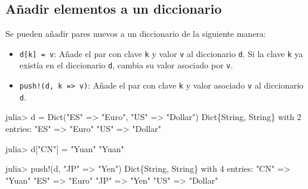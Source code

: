 \documentclass[
  letterpaper,
  DIV=11,
  numbers=noendperiod]{scrreprt}
\newenvironment{Shaded}{\begin{snugshade}}{\end{snugshade}}
\newcommand{\DataTypeTok}[1]{\textcolor[rgb]{0.68,0.00,0.00}{#1}}
\newcommand{\FloatTok}[1]{\textcolor[rgb]{0.68,0.00,0.00}{#1}}
\newcommand{\FunctionTok}[1]{\textcolor[rgb]{0.28,0.35,0.67}{#1}}
\newcommand{\NormalTok}[1]{\textcolor[rgb]{0.00,0.23,0.31}{#1}}
\newcommand{\OperatorTok}[1]{\textcolor[rgb]{0.37,0.37,0.37}{#1}}
\newcommand{\StringTok}[1]{\textcolor[rgb]{0.13,0.47,0.30}{#1}}
\begin{document}
\hypertarget{auxf1adir-elementos-a-un-diccionario}{%
\subsection{Añadir elementos a un
diccionario}\label{auxf1adir-elementos-a-un-diccionario}}

Se pueden añadir pares nuevos a un diccionario de la siguiente manera:

\begin{itemize}
\item
  \texttt{d{[}k{]}\ =\ v}: Añade el par con clave \texttt{k} y valor
  \texttt{v} al diccionario \texttt{d}. Si la clave \texttt{k} ya
  existía en el diccionario \texttt{d}, cambia su valor asociado por
  \texttt{v}.
\item
  \texttt{push!(d,\ k\ =\textgreater{}\ v)}: Añade el par con clave
  \texttt{k} y valor asociado \texttt{v} al diccionario \texttt{d}.
\end{itemize}

\begin{Shaded}
\begin{Highlighting}[]
\NormalTok{julia}\OperatorTok{\textgreater{}}\NormalTok{ d }\OperatorTok{=} \FunctionTok{Dict}\NormalTok{(}\StringTok{"ES"} \OperatorTok{=\textgreater{}} \StringTok{"Euro"}\NormalTok{, }\StringTok{"US"} \OperatorTok{=\textgreater{}} \StringTok{"Dollar"}\NormalTok{)}
\DataTypeTok{Dict}\NormalTok{\{}\DataTypeTok{String}\NormalTok{, }\DataTypeTok{String}\NormalTok{\} with }\FloatTok{2}\NormalTok{ entries}\OperatorTok{:}
  \StringTok{"ES"} \OperatorTok{=\textgreater{}} \StringTok{"Euro"}
  \StringTok{"US"} \OperatorTok{=\textgreater{}} \StringTok{"Dollar"}

\NormalTok{julia}\OperatorTok{\textgreater{}}\NormalTok{ d[}\StringTok{"CN"}\NormalTok{] }\OperatorTok{=} \StringTok{"Yuan"}
\StringTok{"Yuan"}

\NormalTok{julia}\OperatorTok{\textgreater{}} \FunctionTok{push!}\NormalTok{(d, }\StringTok{"JP"} \OperatorTok{=\textgreater{}} \StringTok{"Yen"}\NormalTok{)}
\DataTypeTok{Dict}\NormalTok{\{}\DataTypeTok{String}\NormalTok{, }\DataTypeTok{String}\NormalTok{\} with }\FloatTok{4}\NormalTok{ entries}\OperatorTok{:}
  \StringTok{"CN"} \OperatorTok{=\textgreater{}} \StringTok{"Yuan"}
  \StringTok{"ES"} \OperatorTok{=\textgreater{}} \StringTok{"Euro"}
  \StringTok{"JP"} \OperatorTok{=\textgreater{}} \StringTok{"Yen"}
  \StringTok{"US"} \OperatorTok{=\textgreater{}} \StringTok{"Dollar"}
\end{Highlighting}
\end{Shaded}
\end{document}
